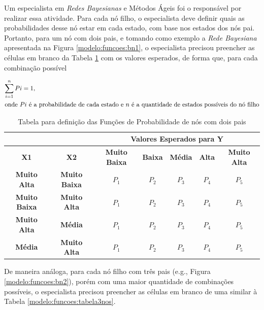 Um especialista em \textit{Redes Bayesianas} e Métodos Ágeis foi o responsável por realizar essa atividade. Para cada nó filho, o especialista deve definir quais as probabilidades desse nó estar em cada estado, com base nos estados dos nós pai. Portanto, para um nó com dois pais, e tomando como exemplo a \textit{Rede Bayesiana} apresentada na Figura \ref{modelo:funcoes:bn1}, o especialista precisou preencher as células em branco da Tabela \ref{modelo:funcoes:tabela2nos} com os valores esperados, de forma que, para cada combinação possível

\begin{align}
  \sum_{i=1}^{n}Pi = 1,\\ \intertext{onde $Pi$ é a probabilidade de cada estado e $n$ é a quantidade de estados possíveis do nó filho}
\end{align}

\begin{table}[ht!]
\centering
\caption{Tabela para definição das Funções de Probabilidade de nós com dois pais}
\label{modelo:funcoes:tabela2nos}
\begin{tabular}{|c|c|c|c|c|c|c|}
\hline
\multicolumn{2}{|l|}{}                      & \multicolumn{5}{c|}{\textbf{Valores Esperados para Y}}                                       \\ \hline
\textbf{X1}          & \textbf{X2}          & \textbf{Muito Baixa} & \textbf{Baixa} & \textbf{Média} & \textbf{Alta} & \textbf{Muito Alta} \\ \hline
\textbf{Muito Alta}  & \textbf{Muito Baixa} & $P_{1}$              & $P_{2}$        & $P_{3}$        & $P_{4}$       & $P_{5}$              \\ \hline
\textbf{Muito Baixa} & \textbf{Muito Alta}  & $P_{1}$              & $P_{2}$        & $P_{3}$        & $P_{4}$       & $P_{5}$             \\ \hline
\textbf{Muito Alta}  & \textbf{Média}       & $P_{1}$              & $P_{2}$        & $P_{3}$        & $P_{4}$       & $P_{5}$             \\ \hline
\textbf{Média}       & \textbf{Muito Alta}  & $P_{1}$              & $P_{2}$        & $P_{3}$        & $P_{4}$       & $P_{5}$             \\ \hline
\end{tabular}
\end{table}

De maneira análoga, para cada nó filho com três pais (e.g., Figura \ref{modelo:funcoes:bn2}), porém com uma maior quantidade de combinações possíveis, o especialista precisou preencher as células em branco de uma similar à Tabela \ref{modelo:funcoes:tabela3nos}.

